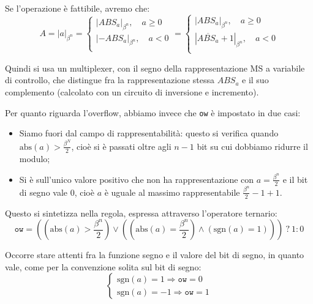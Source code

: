 \documentclass[a4paper,11pt]{article}
\begin{document}
Se l'operazione è fattibile, avremo che:
$$
A = |a|_{\beta^n} =
\begin{cases}
	|ABS_a|_{\beta^n}, \quad a \geq 0 \\ 
	|-ABS_a|_{\beta^n}, \quad a < 0 \\ 
\end{cases} = 
\begin{cases}
	|ABS_a|_{\beta^n}, \quad a \geq 0 \\ 
	|\overline{ABS_a} + 1|_{\beta^n}, \quad a < 0 \\ 
\end{cases} 
$$

Quindi si usa un multiplexer, con il segno della rappresentazione MS a variabile di controllo, che distingue fra la rappresentazione stessa $ABS_a$ e il suo complemento (calcolato con un circuito di inversione e incremento).

Per quanto riguarda l'overflow, abbiamo invece che \lstinline|ow| è impostato in due casi:
\begin{itemize}
	\item Siamo fuori dal campo di rappresentabilità: questo si verifica quando $\mathrm{abs}(a) > \frac{\beta^N}{2}$, cioè si è passati oltre agli $n-1$ bit su cui dobbiamo ridurre il modulo;
	\item Si è sull'unico valore positivo che non ha rappresentazione con $a = \frac{\beta^n}{2}$ e il bit di segno vale 0, cioè $a$ è uguale al massimo rappresentabile $\frac{\beta^n}{2} - 1 + 1$. 
\end{itemize}

Questo si sintetizza nella regola, espressa attraverso l'operatore ternario:
$$
\mathtt{ow} = \left( \left( \mathrm{abs}(a) > \frac{\beta^n}{2} \right) \vee \left( \left( \mathrm{abs}(a) = \frac{\beta^n}{2} \right) \wedge \left( \mathrm{sgn}(a) = 1 \right) \right) \right) \ ? \ 1 : 0
$$

Occorre stare attenti fra la funzione segno e il valore del bit di segno, in quanto vale, come per la convenzione solita sul bit di segno:
\[
	\begin{cases}			
\mathrm{sgn}(a) = 1 \Rightarrow \mathtt{ow} = 0 \\
\mathrm{sgn}(a) = -1 \Rightarrow \mathtt{ow} = 1
	\end{cases}
\]

\par\medskip 
\end{document}
